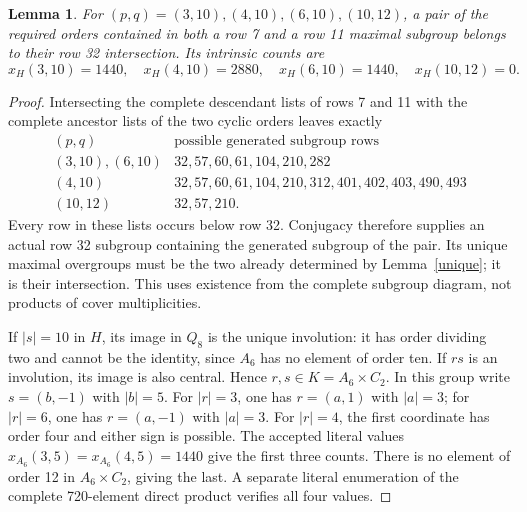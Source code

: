 \documentclass[11pt,a4paper]{article}
\newtheorem{lemma}{Lemma}\newtheorem{theorem}{Theorem}
\begin{document}
\begin{lemma}\label{overlap}
For $(p,q)=(3,10),(4,10),(6,10),(10,12)$, a pair of the required
orders contained in both a row 7 and a row 11 maximal subgroup
belongs to their row 32 intersection. Its intrinsic counts are
\[
 x_H(3,10)=1440,\quad x_H(4,10)=2880,\quad
 x_H(6,10)=1440,\quad x_H(10,12)=0.
\]
\end{lemma}
\begin{proof}
Intersecting the complete descendant lists of rows 7 and 11 with
the complete ancestor lists of the two cyclic orders leaves exactly
\[
\begin{array}{c|l}
(p,q)&\text{possible generated subgroup rows}\\\hline
(3,10),(6,10)&32,57,60,61,104,210,282\\
(4,10)&32,57,60,61,104,210,312,401,402,403,490,493\\
(10,12)&32,57,210.
\end{array}
\]
Every row in these lists occurs below row 32. Conjugacy therefore
supplies an actual row 32 subgroup containing the generated subgroup
of the pair. Its unique maximal overgroups must be the two already
determined by Lemma~\ref{unique}; it is their intersection. This
uses existence from the complete subgroup diagram, not products of
cover multiplicities.

If $|s|=10$ in $H$, its image in $Q_8$ is the unique involution:
it has order dividing two and cannot be the identity, since $A_6$
has no element of order ten. If $rs$ is an involution, its image is
also central. Hence $r,s\in K=A_6\times C_2$. In this group write
$s=(b,-1)$ with $|b|=5$. For $|r|=3$, one has $r=(a,1)$ with
$|a|=3$; for $|r|=6$, one has $r=(a,-1)$ with $|a|=3$.
For $|r|=4$, the first coordinate has order four and either sign
is possible. The accepted literal values
$x_{A_6}(3,5)=x_{A_6}(4,5)=1440$ give the first three counts.
There is no element of order 12 in $A_6\times C_2$, giving the last.
A separate literal enumeration of the complete 720-element direct
product verifies all four values.
\end{proof}
\end{document}
